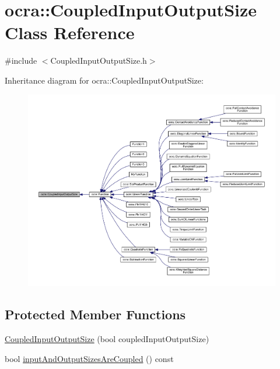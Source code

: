 \hypertarget{classocra_1_1CoupledInputOutputSize}{}\section{ocra\+:\+:Coupled\+Input\+Output\+Size Class Reference}
\label{classocra_1_1CoupledInputOutputSize}


{\ttfamily \#include $<$Coupled\+Input\+Output\+Size.\+h$>$}



Inheritance diagram for ocra\+:\+:Coupled\+Input\+Output\+Size\+:\nopagebreak
\begin{figure}[H]
\begin{center}
\leavevmode
\includegraphics[width=350pt]{db/d0d/classocra_1_1CoupledInputOutputSize__inherit__graph}
\end{center}
\end{figure}
\subsection*{Protected Member Functions}
\begin{DoxyCompactItemize}
\item 
\hyperlink{classocra_1_1CoupledInputOutputSize_a464c947e199233598a248ff6409ab93d}{Coupled\+Input\+Output\+Size} (bool coupled\+Input\+Output\+Size)
\item 
bool \hyperlink{classocra_1_1CoupledInputOutputSize_a10e82ae3bbe410a29f7ed5a54ac105b0}{input\+And\+Output\+Sizes\+Are\+Coupled} () const
\end{DoxyCompactItemize}



